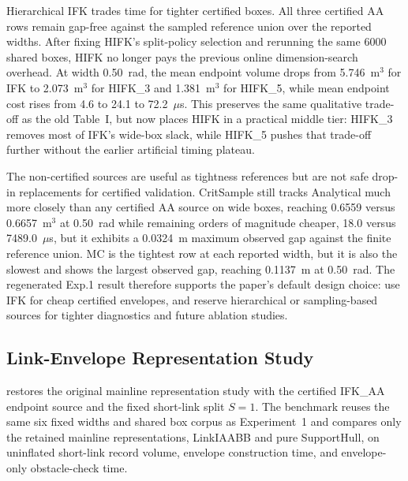 \documentclass[journal]{IEEEtran}
\begin{document}
Hierarchical IFK trades time for tighter certified boxes. All three certified
AA rows remain gap-free against the sampled reference union over the reported
widths. After fixing HIFK's split-policy selection and rerunning the same 6000
shared boxes, HIFK no longer pays the previous online dimension-search
overhead. At width 0.50~rad, the mean endpoint volume drops from 5.746~m$^3$
for IFK to 2.073~m$^3$ for HIFK\_3 and 1.381~m$^3$ for HIFK\_5, while mean
endpoint cost rises from 4.6 to 24.1 to 72.2~$\mu$s. This preserves the same
qualitative trade-off as the old Table~I, but now places HIFK in a practical
middle tier: HIFK\_3 removes most of IFK's wide-box slack, while HIFK\_5 pushes
that trade-off further without the earlier artificial timing plateau.

The non-certified sources are useful as tightness references but are not safe
drop-in replacements for certified validation. CritSample still tracks
Analytical much more closely than any certified AA source on wide boxes,
reaching 0.6559 versus 0.6657~m$^3$ at 0.50~rad while remaining orders of
magnitude cheaper, 18.0 versus 7489.0~$\mu$s, but it exhibits a 0.0324~m maximum
observed gap against the finite reference union. MC is the tightest row at each
reported width, but it is also the slowest and shows the largest observed gap,
reaching 0.1137~m at 0.50~rad. The regenerated Exp.1 result therefore supports
the paper's default design choice: use IFK for cheap certified envelopes, and
reserve hierarchical or sampling-based sources for tighter diagnostics and
future ablation studies.

\subsection{Link-Envelope Representation Study}\label{sec:exp_link_envelopes}

 restores the original
mainline representation study with the certified IFK\_AA endpoint source and
the fixed short-link split $S=1$. The benchmark reuses the same six fixed
widths and shared box corpus as Experiment~1 and compares only the retained
mainline representations, LinkIAABB and pure SupportHull, on uninflated
short-link record volume, envelope construction time, and envelope-only
obstacle-check time.


\end{document}

